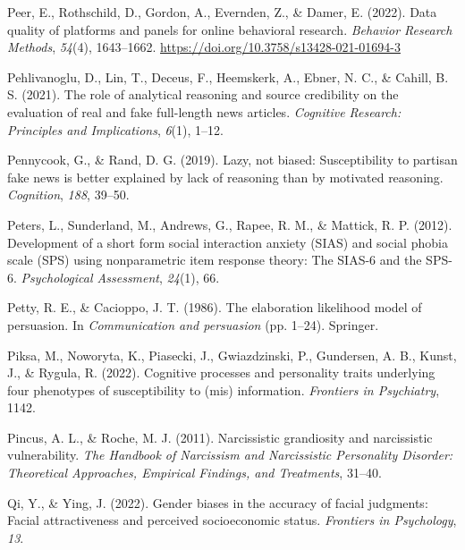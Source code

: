 \documentclass[
  man,floatsintext]{apa6}
\newlength{\cslhangindent}
\newlength{\cslentryspacingunit} %
\newenvironment{CSLReferences}[2] %
 {%
  \setlength{\parindent}{0pt}
  \ifodd #1
  \let\oldpar\par
  \def\par{\hangindent=\cslhangindent\oldpar}
  \fi
  \setlength{\parskip}{#2\cslentryspacingunit}
 }%
 {}
\begin{document}
\begin{CSLReferences}{1}{0}
\leavevmode{}%
Peer, E., Rothschild, D., Gordon, A., Evernden, Z., \& Damer, E. (2022). Data quality of platforms and panels for online behavioral research. \emph{Behavior Research Methods}, \emph{54}(4), 1643--1662. \url{https://doi.org/10.3758/s13428-021-01694-3}

\leavevmode{}%
Pehlivanoglu, D., Lin, T., Deceus, F., Heemskerk, A., Ebner, N. C., \& Cahill, B. S. (2021). The role of analytical reasoning and source credibility on the evaluation of real and fake full-length news articles. \emph{Cognitive Research: Principles and Implications}, \emph{6}(1), 1--12.

\leavevmode{}%
Pennycook, G., \& Rand, D. G. (2019). Lazy, not biased: Susceptibility to partisan fake news is better explained by lack of reasoning than by motivated reasoning. \emph{Cognition}, \emph{188}, 39--50.

\leavevmode{}%
Peters, L., Sunderland, M., Andrews, G., Rapee, R. M., \& Mattick, R. P. (2012). Development of a short form social interaction anxiety (SIAS) and social phobia scale (SPS) using nonparametric item response theory: The SIAS-6 and the SPS-6. \emph{Psychological Assessment}, \emph{24}(1), 66.

\leavevmode{}%
Petty, R. E., \& Cacioppo, J. T. (1986). The elaboration likelihood model of persuasion. In \emph{Communication and persuasion} (pp. 1--24). Springer.

\leavevmode{}%
Piksa, M., Noworyta, K., Piasecki, J., Gwiazdzinski, P., Gundersen, A. B., Kunst, J., \& Rygula, R. (2022). Cognitive processes and personality traits underlying four phenotypes of susceptibility to (mis) information. \emph{Frontiers in Psychiatry}, 1142.

\leavevmode{}%
Pincus, A. L., \& Roche, M. J. (2011). Narcissistic grandiosity and narcissistic vulnerability. \emph{The Handbook of Narcissism and Narcissistic Personality Disorder: Theoretical Approaches, Empirical Findings, and Treatments}, 31--40.

\leavevmode{}%
Qi, Y., \& Ying, J. (2022). Gender biases in the accuracy of facial judgments: Facial attractiveness and perceived socioeconomic status. \emph{Frontiers in Psychology}, \emph{13}.


\end{CSLReferences}
\end{document}
